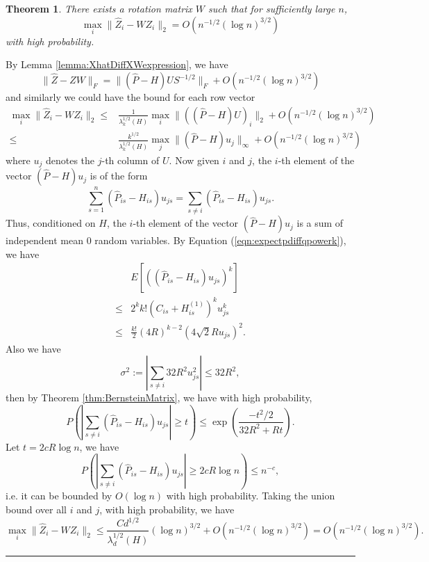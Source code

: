 \documentclass[a4paper]{article}
\newenvironment{proof}{{\bf Proof:  }}{\hfill\rule{2mm}{2mm}}
\newtheorem{theorem}[fact]{Theorem}
\begin{document}
\begin{theorem}
\label{thm:XhatDiffXW}
There exists a rotation matrix $W$ such that for sufficiently large $n$,
\[
	\max_i \| \hat{Z}_i - W Z_i \|_2 = O(n^{-1/2} (\log n)^{3/2})
\]
with high probability.
\end{theorem}
\begin{proof}
By Lemma \ref{lemma:XhatDiffXWexpression}, we have
\[
	\|\hat{Z} - Z W\|_F = \| (\hat{P} - H) U S^{-1/2} \|_F + O(n^{-1/2} (\log n)^{3/2})
\]
and similarly we could have the bound for each row vector
\begin{align*}
	\max_i \| \hat{Z}_i - W Z_i \|_2
    \le & \frac{1}{\lambda_k^{1/2}(H)} \max_i \| ((\hat{P} - H) U)_i \|_2 + O(n^{-1/2} (\log n)^{3/2}) \\
    \le & \frac{k^{1/2}}{\lambda_k^{1/2}(H)} \max_j \| (\hat{P} - H) u_j \|_{\infty} + O(n^{-1/2} (\log n)^{3/2})
\end{align*}
where $u_j$ denotes the $j$-th column of $U$. Now given $i$ and $j$, the $i$-th element of the vector $(\hat{P} - H) u_j$ is of the form
\[
	\sum_{s=1}^n (\hat{P}_{is} - H_{is}) u_{js} = \sum_{s \ne i} (\hat{P}_{is} - H_{is}) u_{js}.
\]
Thus, conditioned on $H$, the $i$-th element of the vector $(\hat{P} - H) u_j$ is a sum of independent mean 0 random variables.
By Equation (\ref{eqn:expectpdiffqpowerk}), we have
\begin{align*}
	& E\left[\left((\hat{P}_{is} - H_{is}) u_{js}\right)^k\right] \\ 
    \le & 2^k k! (C_{is} + H_{is}^{(1)})^k u_{js}^k \\
    \le & \frac{k!}{2} (4 R)^{k-2} (4\sqrt{2} R u_{js})^2.
\end{align*}
Also we have
\[
	\sigma^2 := |\sum_{s \ne i} 32 R^2 u_{js}^2|
    \le 32 R^2,
\]
then by Theorem \ref{thm:BernsteinMatrix}, we have with high probability,
\[
	P \left( \left| \sum_{s \ne i} (\hat{P}_{is} - H_{is}) u_{js} \right| \ge t \right)
    \le \exp \left( \frac{-t^2/2}{32 R^2 + R t} \right).
\]
Let $t = 2 c R \log n$, we have
\[
	P \left( \left| \sum_{s \ne i} (\hat{P}_{is} - H_{is}) u_{js} \right| \ge 2 c R \log n \right)
    \le n^{-c},
\]
i.e. it can be bounded by $O(\log n)$ with high probability.
Taking the union bound over all $i$ and $j$, with high probability, we have
\[
	\max_i \| \hat{Z}_i - W Z_i \|_2
    \le \frac{C d^{1/2}}{\lambda_d^{1/2}(H)} (\log n)^{3/2} + O(n^{-1/2} (\log n)^{3/2})
    = O(n^{-1/2} (\log n)^{3/2}).
\]
\end{proof}
\end{document}
